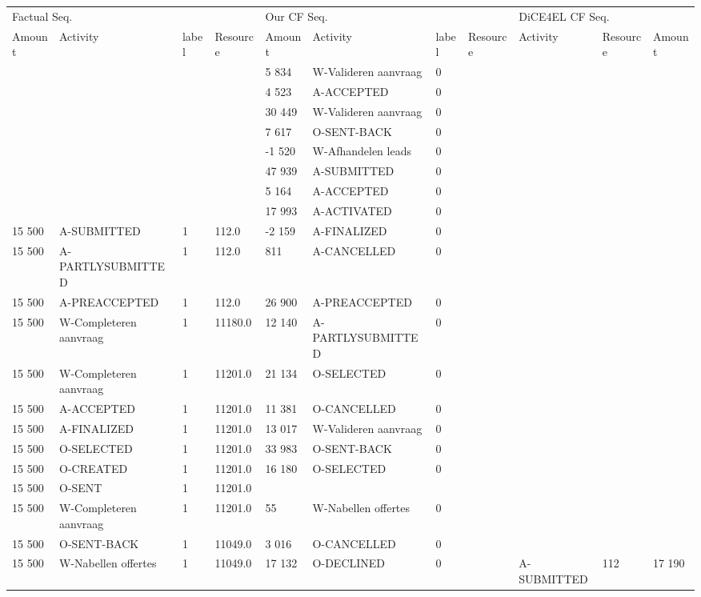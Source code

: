 \begin{tabular}{lllllllllll}
\toprule
\multicolumn{4}{l}{Factual Seq.} & \multicolumn{4}{l}{Our CF Seq.} & \multicolumn{3}{l}{DiCE4EL CF Seq.} \\
Amount & Activity & label & Resource & Amount & Activity & label & Resource & Activity & Resource & Amount \\
\midrule
 &  &  &  & 5 834 & W-Valideren aanvraag & 0 &  &  &  &  \\
 &  &  &  & 4 523 & A-ACCEPTED & 0 &  &  &  &  \\
 &  &  &  & 30 449 & W-Valideren aanvraag & 0 &  &  &  &  \\
 &  &  &  & 7 617 & O-SENT-BACK & 0 &  &  &  &  \\
 &  &  &  & -1 520 & W-Afhandelen leads & 0 &  &  &  &  \\
 &  &  &  & 47 939 & A-SUBMITTED & 0 &  &  &  &  \\
 &  &  &  & 5 164 & A-ACCEPTED & 0 &  &  &  &  \\
 &  &  &  & 17 993 & A-ACTIVATED & 0 &  &  &  &  \\
15 500 & A-SUBMITTED & 1 & 112.0 & -2 159 & A-FINALIZED & 0 &  &  &  &  \\
15 500 & A-PARTLYSUBMITTED & 1 & 112.0 & 811 & A-CANCELLED & 0 &  &  &  &  \\
15 500 & A-PREACCEPTED & 1 & 112.0 & 26 900 & A-PREACCEPTED & 0 &  &  &  &  \\
15 500 & W-Completeren aanvraag & 1 & 11180.0 & 12 140 & A-PARTLYSUBMITTED & 0 &  &  &  &  \\
15 500 & W-Completeren aanvraag & 1 & 11201.0 & 21 134 & O-SELECTED & 0 &  &  &  &  \\
15 500 & A-ACCEPTED & 1 & 11201.0 & 11 381 & O-CANCELLED & 0 &  &  &  &  \\
15 500 & A-FINALIZED & 1 & 11201.0 & 13 017 & W-Valideren aanvraag & 0 &  &  &  &  \\
15 500 & O-SELECTED & 1 & 11201.0 & 33 983 & O-SENT-BACK & 0 &  &  &  &  \\
15 500 & O-CREATED & 1 & 11201.0 & 16 180 & O-SELECTED & 0 &  &  &  &  \\
15 500 & O-SENT & 1 & 11201.0 &  &  &  &  &  &  &  \\
15 500 & W-Completeren aanvraag & 1 & 11201.0 & 55 & W-Nabellen offertes & 0 &  &  &  &  \\
15 500 & O-SENT-BACK & 1 & 11049.0 & 3 016 & O-CANCELLED & 0 &  &  &  &  \\
15 500 & W-Nabellen offertes & 1 & 11049.0 & 17 132 & O-DECLINED & 0 &  & A-SUBMITTED & 112 & 17 190 \\

\end{tabular}

